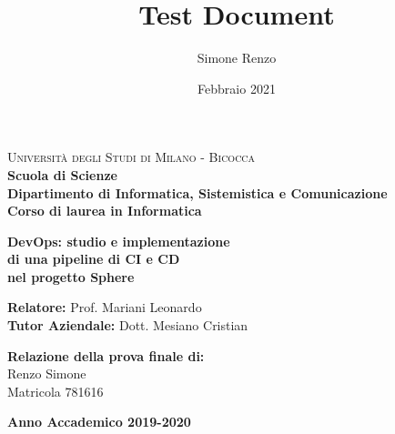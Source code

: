 \documentclass[a4paper,12pt]{report}
\title{Test Document}
\author{Simone Renzo}
\date{Febbraio 2021}
\begin{document}
	
	\begin{titlepage}
		\noindent
		\begin{minipage}[t]{0.19\textwidth}
		\end{minipage}
		\begin{minipage}[t]{0.81\textwidth}
			{
				{\textsc{Università degli Studi di Milano - Bicocca}} \\
				\textbf{Scuola di Scienze} \\
				\textbf{Dipartimento di Informatica, Sistemistica e Comunicazione} \\
				\textbf{Corso di laurea in Informatica} \\
				\par
			}
		\end{minipage}
		
		\vspace{40mm}
		
		\begin{center}
			{\LARGE{
					\textbf{DevOps: studio e implementazione \\ di una pipeline di CI e CD \\ nel progetto Sphere}
					\par
			}}
		\end{center}
		
		\vspace{40mm}
		
		\noindent
		{\large \textbf{Relatore:} Prof. Mariani Leonardo} \\
		
		\noindent
		{\large \textbf{Tutor Aziendale:} Dott. Mesiano Cristian}
		
		\vspace{15mm}
		
		\begin{flushright}
			{\large \textbf{Relazione della prova finale di:}} \\
			\large{Renzo Simone} \\
			\large{Matricola 781616} 
		\end{flushright}
		
		\vspace{40mm}
		\begin{center}
			{\large{\bf Anno Accademico 2019-2020}}
		\end{center}
		
		\restoregeometry
		
	\end{titlepage}
	
\end{document}
